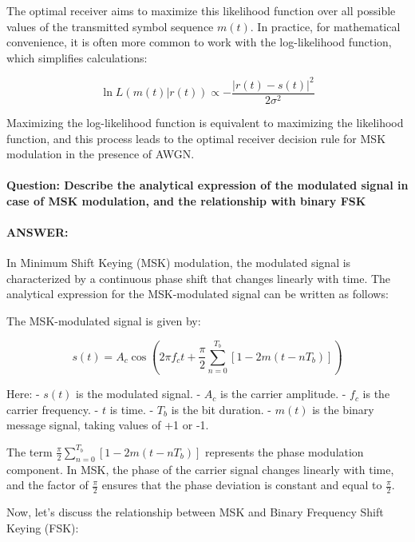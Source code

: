 \documentclass[colorlinks,11pt,a4paper,normalphoto,withhyper,ragged2e]{altareport}
\begin{document}
				The optimal receiver aims to maximize this likelihood function over all possible values of the transmitted symbol sequence \(m(t)\). In practice, for mathematical convenience, it is often more common to work with the log-likelihood function, which simplifies calculations:
				
				\[ \ln L(m(t)|r(t)) \propto -\frac{|r(t) - s(t)|^2}{2\sigma^2} \]
				
				Maximizing the log-likelihood function is equivalent to maximizing the likelihood function, and this process leads to the optimal receiver decision rule for MSK modulation in the presence of AWGN.
				
				
				
				
				
				
				
				\paragraph{Question: Describe the analytical expression of the modulated signal in case of MSK modulation, and the relationship with binary FSK}
				\paragraph{ANSWER:}
				
				
				In Minimum Shift Keying (MSK) modulation, the modulated signal is characterized by a continuous phase shift that changes linearly with time. The analytical expression for the MSK-modulated signal can be written as follows:
				
				The MSK-modulated signal is given by:
				
				\[ s(t) = A_c \cos\left(2\pi f_c t + \frac{\pi}{2}\sum_{n=0}^{T_b}\left[1-2m(t-nT_b)\right]\right) \]
				
				Here:
				- \(s(t)\) is the modulated signal.
				- \(A_c\) is the carrier amplitude.
				- \(f_c\) is the carrier frequency.
				- \(t\) is time.
				- \(T_b\) is the bit duration.
				- \(m(t)\) is the binary message signal, taking values of +1 or -1.
				
				The term \(\frac{\pi}{2}\sum_{n=0}^{T_b}\left[1-2m(t-nT_b)\right]\) represents the phase modulation component. In MSK, the phase of the carrier signal changes linearly with time, and the factor of \(\frac{\pi}{2}\) ensures that the phase deviation is constant and equal to \(\frac{\pi}{2}\).
				
				Now, let's discuss the relationship between MSK and Binary Frequency Shift Keying (FSK):
				
\end{document}
